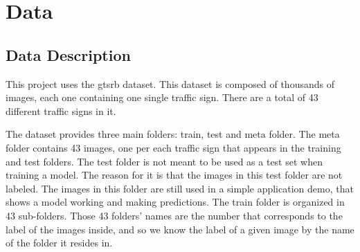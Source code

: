 \documentclass[12pt]{article}
\begin{document}
\tableofcontents

\clearpage
{}


\section{Data}
\label{section.data}

\subsection{Data Description}
\label{subsection.data_description}
    \par
        This project uses the \ac{gtsrb}\cite{kaggle_dataset} dataset. This dataset is composed of thousands of images, each one containing
        one single traffic sign. There are a total of 43 different traffic signs in it. 
    \par 
        The dataset provides three main folders: train, test and meta folder. The meta folder contains 43 images, one per each traffic sign 
        that appears in the training and test folders. The test folder is not meant to be used as a test set when training a model. The reason 
        for it is that the images in this test folder are not labeled. The images in this folder are still used in a simple application demo, that shows 
        a model working and making predictions. The train folder is organized in 43 sub-folders. Those 43 folders' 
        names are the number that corresponds to the label of the images inside, and so we know the label of a given image by the name of the folder it 
        resides in.
\end{document}
